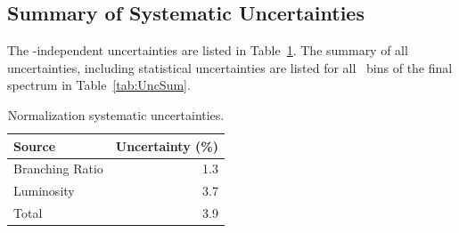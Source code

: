 \subsection{Summary of Systematic Uncertainties}
%

The \pt-independent uncertainties are listed in Table~\ref{tab:CorrFixSystUnc}. 
The summary of all uncertainties, including statistical uncertainties are listed for all \ptchjet\ bins of the final spectrum in Table~\ref{tab:UncSum}.

\begin{table}[bth]
\caption{Normalization systematic uncertainties.}
     \label{tab:CorrFixSystUnc}
\begin{center}
    \begin{tabular}{lr}
    \hline
Source & Uncertainty (\%) \\ \hline
Branching Ratio & 1.3 \\
Luminosity &  3.7\\
\hline
Total & 3.9 \\
\hline
    \end{tabular}
    \end{center}
    \end{table}
    
